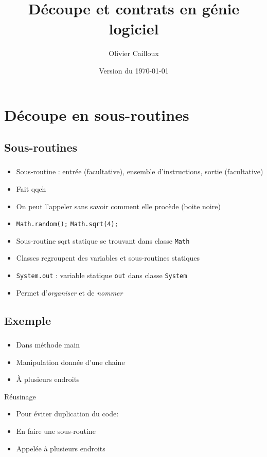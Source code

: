 \documentclass[english, french]{beamer}
\title{Découpe et contrats en génie logiciel}
\subtitle{}
\author{Olivier Cailloux}
\institute[LAMSADE]{LAMSADE, Université Paris-Dauphine}
\date{Version du \today}
\begin{document}


\begin{frame}[plain]
   \titlepage
\end{frame}
\addtocounter{framenumber}{-1}

\section{Découpe en sous-routines}
\subsection{Sous-routines}
\begin{frame}
	\frametitle{\subsecname}
	\begin{itemize}
		\item Sous-routine : entrée (facultative), ensemble d’instructions, sortie (facultative)
		\item Fait qqch
		\item On peut l’appeler sans savoir comment elle procède (boite noire)
		\item \texttt{Math.random();} \texttt{Math.sqrt(4);}
		\item Sous-routine sqrt statique se trouvant dans classe \texttt{Math}
		\item Classes regroupent des variables et sous-routines statiques
		\item \texttt{System.out} : variable statique \texttt{out} dans classe \texttt{System}
		\item Permet d’\emph{organiser} et de \emph{nommer}
	\end{itemize}
\end{frame}

\subsection{Exemple}
\begin{frame}
	\frametitle{\subsecname}
	\begin{itemize}
		\item Dans méthode main
		\item Manipulation donnée d’une chaine
		\item À plusieurs endroits
	\end{itemize}
	\begin{block}{Réusinage}
		\begin{itemize}
			\item Pour éviter duplication du code:
			\item En faire une sous-routine
			\item Appelée à plusieurs endroits
		\end{itemize}
	\end{block}
\end{frame}
\end{document}
